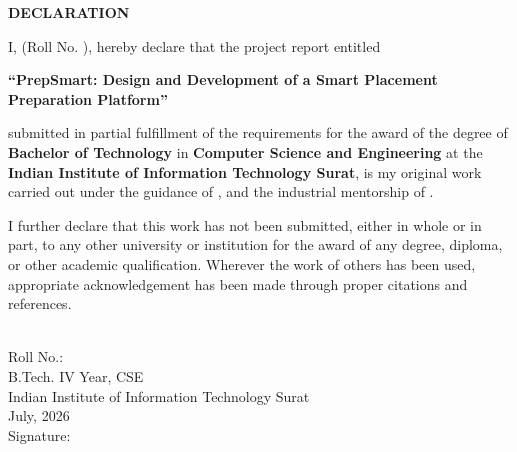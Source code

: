 \thispagestyle{plain}

\begin{center}
{\Large\bfseries\uppercase{Declaration}}
\end{center}

\vspace{0.8cm}

\justify

I, \textbf{\myname} (Roll No. \textbf{\myrollno}), hereby declare that the project report entitled

\begin{center}
\textbf{``PrepSmart: Design and Development of a Smart Placement Preparation Platform''}
\end{center}

submitted in partial fulfillment of the requirements for the award of the degree of \textbf{Bachelor of Technology} in \textbf{Computer Science and Engineering} at the \textbf{Indian Institute of Information Technology Surat}, is my original work carried out under the guidance of \textbf{\mysupervisor}, \textbf{\myexaminer} and the industrial mentorship of \textbf{\myindustrysupervisor}.

I further declare that this work has not been submitted, either in whole or in part, to any other university or institution for the award of any degree, diploma, or other academic qualification. Wherever the work of others has been used, appropriate acknowledgement has been made through proper citations and references.

\vspace{2.2cm}

\begin{flushright}
\textbf{\myname}\\[4pt]
Roll No.: \myrollno\\[4pt]
B.Tech. IV Year, CSE\\[4pt]
Indian Institute of Information Technology Surat\\[4pt]
July, 2026\\[1cm]
Signature: \underline{\hspace{4cm}}
\end{flushright}

\newpage